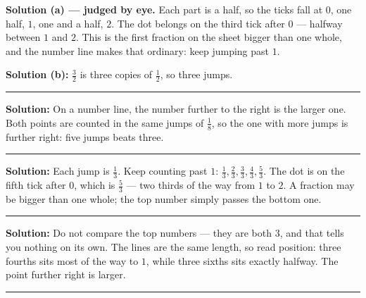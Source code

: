 \documentclass[12pt]{article}
\begin{document}

\textbf{Solution (a) --- judged by eye.} Each part is a half, so the ticks fall at $0$, one half, $1$,
one and a half, $2$. The dot belongs on the third tick after $0$ --- halfway between $1$ and $2$.
This is the first fraction on the sheet bigger than one whole, and the number line makes that
ordinary: keep jumping past $1$.

\textbf{Solution (b):} $\frac{3}{2}$ is three copies of $\frac{1}{2}$, so three jumps. 

\vspace{0.15cm}\noindent\rule{\linewidth}{0.2pt}


\textbf{Solution:} On a number line, the number further to the right is the larger one. Both points
are counted in the same jumps of $\frac{1}{8}$, so the one with more jumps is further right:
five jumps beats three. 

\vspace{0.15cm}\noindent\rule{\linewidth}{0.2pt}


\textbf{Solution:} Each jump is $\frac{1}{3}$. Keep counting past $1$: $\frac{1}{3}, \frac{2}{3},
\frac{3}{3}, \frac{4}{3}, \frac{5}{3}$. The dot is on the fifth tick after $0$, which is
$\frac{5}{3}$ --- two thirds of the way from $1$ to $2$. A fraction may be bigger than one whole; the
top number simply passes the bottom one. 

\vspace{0.15cm}\noindent\rule{\linewidth}{0.2pt}


\textbf{Solution:} Do not compare the top numbers --- they are both $3$, and that tells you nothing on
its own. The lines are the same length, so read position: three fourths sits most of the way to $1$,
while three sixths sits exactly halfway. The point further right is larger. 

\vspace{0.15cm}\noindent\rule{\linewidth}{0.2pt}
\end{document}
